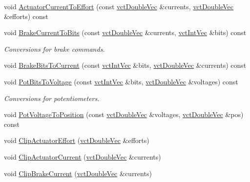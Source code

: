 \begin{DoxyCompactItemize}
\item 
void \hyperlink{classsaw_robot_i_o1394_1_1osa_robot1394_a414f641a56bffe2120265f739b14fb8e}{Actuator\-Current\-To\-Effort} (const \hyperlink{vct_dynamic_vector_types_8h_ade4b3068c86fb88f41af2e5187e491c2}{vct\-Double\-Vec} \&currents, \hyperlink{vct_dynamic_vector_types_8h_ade4b3068c86fb88f41af2e5187e491c2}{vct\-Double\-Vec} \&efforts) const 
\item 
void \hyperlink{classsaw_robot_i_o1394_1_1osa_robot1394_a7e92d8c12c7df3258b6cbf2ff4f3b34f}{Brake\-Current\-To\-Bits} (const \hyperlink{vct_dynamic_vector_types_8h_ade4b3068c86fb88f41af2e5187e491c2}{vct\-Double\-Vec} \&currents, \hyperlink{vct_dynamic_vector_types_8h_a47260df0b570a25352b3f318ed0b4c4e}{vct\-Int\-Vec} \&bits) const 
\begin{DoxyCompactList}\small\item\em Conversions for brake commands. \end{DoxyCompactList}\item 
void \hyperlink{classsaw_robot_i_o1394_1_1osa_robot1394_ad4d4e27d20db8e829190b67d12b3849f}{Brake\-Bits\-To\-Current} (const \hyperlink{vct_dynamic_vector_types_8h_a47260df0b570a25352b3f318ed0b4c4e}{vct\-Int\-Vec} \&bits, \hyperlink{vct_dynamic_vector_types_8h_ade4b3068c86fb88f41af2e5187e491c2}{vct\-Double\-Vec} \&currents) const 
\item 
void \hyperlink{classsaw_robot_i_o1394_1_1osa_robot1394_ab0b7370aab8c9ddd1baeecdf5db6686a}{Pot\-Bits\-To\-Voltage} (const \hyperlink{vct_dynamic_vector_types_8h_a47260df0b570a25352b3f318ed0b4c4e}{vct\-Int\-Vec} \&bits, \hyperlink{vct_dynamic_vector_types_8h_ade4b3068c86fb88f41af2e5187e491c2}{vct\-Double\-Vec} \&voltages) const 
\begin{DoxyCompactList}\small\item\em Conversions for potentiometers. \end{DoxyCompactList}\item 
void \hyperlink{classsaw_robot_i_o1394_1_1osa_robot1394_a2f9dee18922338235bafae71cdf9b455}{Pot\-Voltage\-To\-Position} (const \hyperlink{vct_dynamic_vector_types_8h_ade4b3068c86fb88f41af2e5187e491c2}{vct\-Double\-Vec} \&voltages, \hyperlink{vct_dynamic_vector_types_8h_ade4b3068c86fb88f41af2e5187e491c2}{vct\-Double\-Vec} \&pos) const 
\item 
void \hyperlink{classsaw_robot_i_o1394_1_1osa_robot1394_a4fca5b824e45e5ee67b0e4c85f5e578d}{Clip\-Actuator\-Effort} (\hyperlink{vct_dynamic_vector_types_8h_ade4b3068c86fb88f41af2e5187e491c2}{vct\-Double\-Vec} \&efforts)
\item 
void \hyperlink{classsaw_robot_i_o1394_1_1osa_robot1394_acf20ff44ca8642b3bde8666b5c44b96b}{Clip\-Actuator\-Current} (\hyperlink{vct_dynamic_vector_types_8h_ade4b3068c86fb88f41af2e5187e491c2}{vct\-Double\-Vec} \&currents)
\item 
void \hyperlink{classsaw_robot_i_o1394_1_1osa_robot1394_aa9f9b0e565e7b7546a83288b95c51fd1}{Clip\-Brake\-Current} (\hyperlink{vct_dynamic_vector_types_8h_ade4b3068c86fb88f41af2e5187e491c2}{vct\-Double\-Vec} \&currents)
\end{DoxyCompactItemize}


